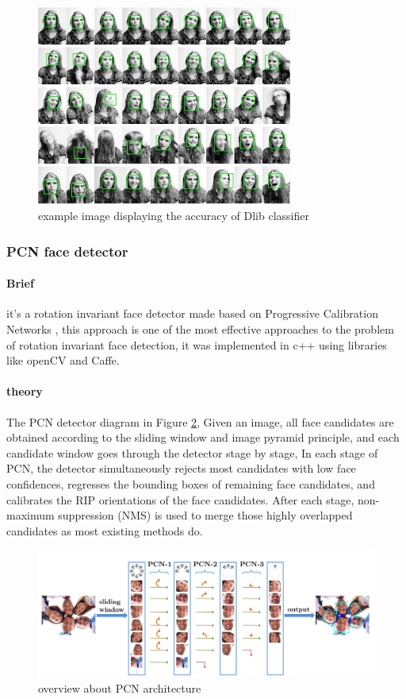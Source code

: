 \begin{figure}
	\centering
	\includegraphics[width=0.75\textwidth]{images/dlib_example.jpg}
	\caption{example image displaying the accuracy of Dlib classifier}
	\label{fig:dlib_example}
\end{figure}

\subsubsection{PCN face detector}
\paragraph{Brief}
it's a rotation invariant face detector made based on Progressive Calibration Networks \cite{PCN}, this approach is one of the most effective approaches to the problem of rotation invariant face detection, it was implemented in c++ using libraries like openCV and Caffe.
\paragraph{theory}
The PCN detector diagram in Figure \ref{fig:PCN_archOverview}, Given an image, all face candidates are obtained according to the sliding window and image pyramid principle, and each candidate window goes through the detector stage by stage, In each stage of PCN, the detector simultaneously rejects most candidates with low face confidences, regresses the bounding boxes of remaining face candidates, and calibrates the RIP orientations of the face candidates. After each stage, non-maximum suppression (NMS) is used to merge those highly overlapped candidates as most existing methods do.
\begin{figure}
	\centering
	\includegraphics[width=\textwidth]{images/PCN_archOverview.png}
	\caption{overview about PCN architecture \cite{PCN}}
	\label{fig:PCN_archOverview}
\end{figure}
